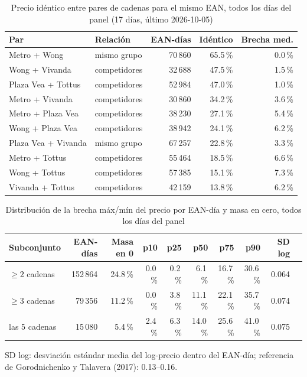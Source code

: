 
\begin{table}[htbp]
\caption{Precio id\'entico entre pares de cadenas para el mismo EAN, todos los d\'ias del panel (17 d\'ias, \'ultimo 2026-10-05)}
\label{tab:identidad}
\centering\scriptsize\setlength{\tabcolsep}{3pt}
\begin{tabular}{@{}llrrr@{}}
\toprule
Par & Relaci\'on & EAN-d\'ias & Id\'entico & Brecha med. \\
\midrule
Metro + Wong & mismo grupo & 70\,860 & 65.5\,\% & 0.0\,\% \\
Wong + Vivanda & competidores & 32\,688 & 47.5\,\% & 1.5\,\% \\
Plaza Vea + Tottus & competidores & 52\,984 & 47.0\,\% & 1.0\,\% \\
Metro + Vivanda & competidores & 30\,860 & 34.2\,\% & 3.6\,\% \\
Metro + Plaza Vea & competidores & 38\,230 & 27.1\,\% & 5.4\,\% \\
Wong + Plaza Vea & competidores & 38\,942 & 24.1\,\% & 6.2\,\% \\
Plaza Vea + Vivanda & mismo grupo & 67\,257 & 22.8\,\% & 3.3\,\% \\
Metro + Tottus & competidores & 55\,464 & 18.5\,\% & 6.6\,\% \\
Wong + Tottus & competidores & 57\,385 & 15.1\,\% & 7.3\,\% \\
Vivanda + Tottus & competidores & 42\,159 & 13.8\,\% & 6.2\,\% \\
\bottomrule\end{tabular}\end{table}

\begin{table}[t]
\caption{Distribuci\'on de la brecha m\'ax/m\'in del precio por EAN-d\'ia y masa en cero, todos los d\'ias del panel}
\label{tab:brecha}
\centering\scriptsize\setlength{\tabcolsep}{4pt}
\begin{tabular}{@{}lrrrrrrrrr@{}}
\toprule
Subconjunto & EAN-d\'ias & Masa en 0 & p10 & p25 & p50 & p75 & p90 & SD log \\
\midrule
$\geq 2$ cadenas & 152\,864 & 24.8\,\% & 0.0\,\% & 0.2\,\% & 6.1\,\% & 16.7\,\% & 30.6\,\% & 0.064 \\
$\geq 3$ cadenas & 79\,356 & 11.2\,\% & 0.0\,\% & 3.8\,\% & 11.1\,\% & 22.1\,\% & 35.7\,\% & 0.074 \\
las 5 cadenas & 15\,080 & 5.4\,\% & 2.4\,\% & 6.3\,\% & 14.0\,\% & 25.6\,\% & 41.0\,\% & 0.075 \\
\bottomrule\end{tabular}
\par\smallskip\raggedright\scriptsize SD log: desviaci\'on est\'andar media del log-precio dentro del EAN-d\'ia; referencia de Gorodnichenko y Talavera (2017): 0.13--0.16.
\end{table}

